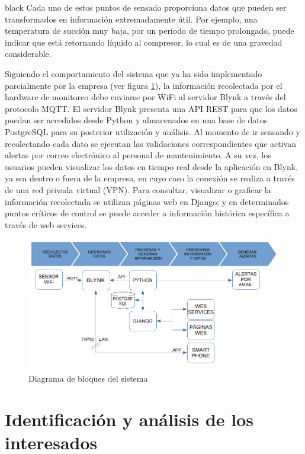 \documentclass[
11pt, %
]{charter}
\begin{document}
\begin{consigna}{black}
Cada uno de estos puntos de sensado proporciona datos que pueden ser transformados en información extremadamente útil. Por ejemplo, una temperatura de succión muy baja, por un período de tiempo prolongado, puede indicar que está retornando líquido al compresor, lo cual es de una gravedad considerable.

Siguiendo el comportamiento del sistema que ya ha sido implementado parcialmente por la empresa (ver figura \ref{fig:diagramabloques}), la información recolectada por el hardware de monitoreo debe enviarse por WiFi al servidor Blynk a través del protocolo MQTT. El servidor Blynk presenta una API REST para que los datos puedan ser accedidos desde Python y almacenados en una base de datos PostgreSQL para su posterior utilización y análisis. Al momento de ir sensando y recolectando cada dato se ejecutan las validaciones correspondientes que activan alertas por correo electrónico al personal de mantenimiento. A su vez, los usuarios pueden visualizar los datos en tiempo real desde la aplicación en Blynk, ya sea dentro o fuera de la empresa, en cuyo caso la conexión se realiza a través de una red privada virtual (VPN). Para consultar, visualizar o graficar la información recolectada se utilizan páginas web en Django; y en determinados puntos críticos de control se puede acceder a información histórica específica a través de web services.

\begin{figure}[htpb]
\centering 
\includegraphics[width=.9\textwidth]{./Figuras/diagramabloques.png}
\caption{Diagrama de bloques del sistema}
\label{fig:diagramabloques}
\end{figure}

\end{consigna}

\section{Identificación y análisis de los interesados}
\label{sec:interesados}
\end{document}
